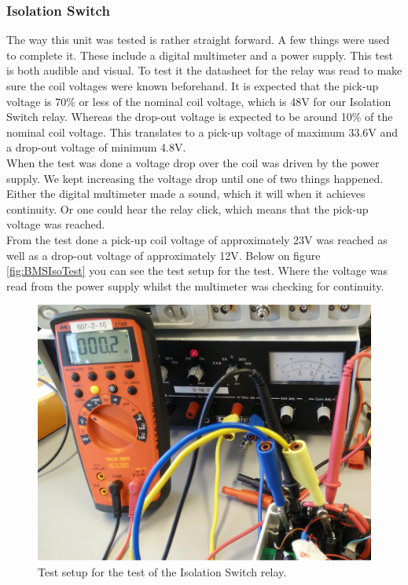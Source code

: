 \subsubsection{Isolation Switch}
The way this unit was tested is rather straight forward. A few things were used to complete it. These include a digital multimeter and a power supply. This test is both audible and visual. To test it the datasheet\cite{BMSRelay} for the relay was read to make sure the coil voltages were known beforehand. It is expected that the pick-up voltage is 70\% or less of the nominal coil voltage, which is 48V for our Isolation Switch relay. Whereas the drop-out voltage is expected to be around 10\% of the nominal coil voltage. This translates to a pick-up voltage of maximum 33.6V and a drop-out voltage of minimum 4.8V.\\
When the test was done a voltage drop over the coil was driven by the power supply. We kept increasing the voltage drop until one of two things happened. Either the digital multimeter made a sound, which it will when it achieves continuity. Or one could hear the relay click, which means that the pick-up voltage was reached.\\
From the test done a pick-up coil voltage of approximately 23V was reached as well as a drop-out voltage of approximately 12V. Below on figure \vref{fig:BMSIsoTest} you can see the test setup for the test. Where the voltage was read from the power supply whilst the multimeter was checking for continuity. 

\begin{figure}[H]
	\centering
	\includegraphics[width=1.0\linewidth]{Hardware/Pictures/BMSIsoTest}
	\caption[Empty]{Test setup for the test of the Isolation Switch relay.}
	\label{fig:BMSIsoTest}
\end{figure}

